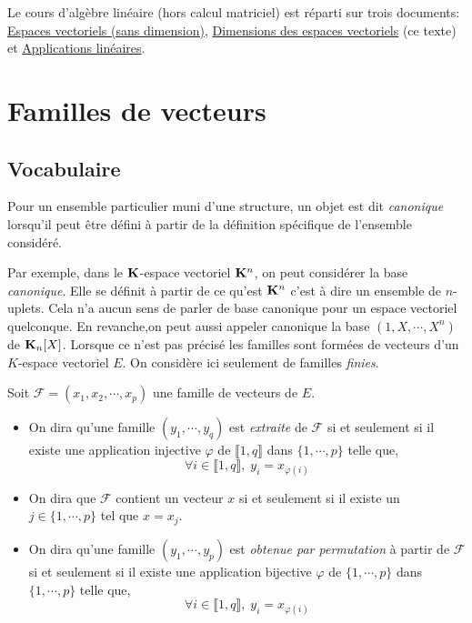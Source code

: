 
Le cours d'algèbre linéaire (hors calcul matriciel) est réparti sur trois documents:  \href{\baseurl C2076.pdf}{Espaces vectoriels (sans dimension)},  \href{\baseurl C2112.pdf}{Dimensions des espaces vectoriels}  (ce texte) et \href{\baseurl C9587.pdf}{Applications linéaires}.

\section{Familles de vecteurs}\label{FamVect}
\subsection{Vocabulaire}
\begin{defi}
 Pour un ensemble particulier muni d'une structure, un objet est dit \emph{canonique} lorsqu'il peut être défini à partir de la définition spécifique de l'ensemble considéré.
\end{defi}
Par exemple, dans le $\mathbf{K}$-espace vectoriel $\mathbf{K}^n$, on peut considérer la base \emph{canonique}. Elle se définit à partir de ce qu'est $\mathbf{K}^n$ c'est à dire un ensemble de $n$-uplets. Cela n'a aucun sens de parler de base canonique pour un espace vectoriel quelconque. En revanche,on peut aussi appeler canonique la base $(1,X,\cdots,X^n)$ de $\mathbf{K}_n[X]$.
Lorsque ce n'est pas précisé les familles sont formées de vecteurs d'un $K$-espace vectoriel $E$. On considère ici seulement de familles \emph{finies}.
\begin{defi}
 Soit $\mathcal F = (x_1,x_2,\cdots,x_p)$ une famille de vecteurs de $E$.
\begin{itemize}
 \item On dira qu'une famille $(y_1,\cdots,y_q)$ est \emph{extraite} de $\mathcal F$ si et seulement si il existe une application injective $\varphi$ de $\llbracket 1,q \rrbracket$ dans $\{1,\cdots,p\}$ telle que,
\begin{displaymath}
 \forall i\in\llbracket 1,q \rrbracket, \; y_i = x_{\varphi(i)}
\end{displaymath}
 \item  On dira que $\mathcal F$ contient un vecteur $x$ si et seulement si il existe un $j\in\{1,\cdots,p\}$ tel que $x=x_j$.
 \item On dira qu'une famille $(y_1,\cdots,y_p)$ est \emph{obtenue par permutation} à partir de $\mathcal F$ si et seulement si  il existe une application bijective $\varphi$ de $\{1,\cdots,p\}$ dans $\{1,\cdots,p\}$ telle que,
\begin{displaymath}
 \forall i\in\llbracket 1,q \rrbracket, \; y_i = x_{\varphi(i)}
\end{displaymath}
\end{itemize}
\end{defi}
